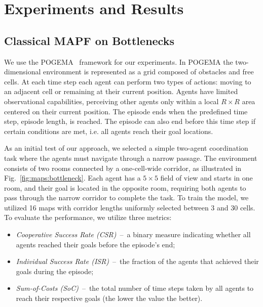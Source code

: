 \documentclass{article} %
\begin{document}
\section{Experiments and Results}


\subsection{Classical MAPF on Bottlenecks}

We use the POGEMA~\citep{skrynnik2024pogema} framework for our experiments. In POGEMA the two-dimensional environment is represented as a grid composed of obstacles and free cells. At each time step each agent can perform two types of actions: moving to an adjacent cell or remaining at their current position. Agents have limited observational capabilities, perceiving other agents only within a local $R\times R$ area centered on their current position. The episode ends when the predefined time step, episode length, is reached. The episode can also end before this time step if certain conditions are met, i.e. all agents reach their goal locations.

As an initial test of our approach, we selected a simple two-agent coordination task where the agents must navigate through a narrow passage. The environment consists of two rooms connected by a one-cell-wide corridor, as illustrated in Fig.~\ref{fig:maps:bottleneck}. Each agent has a $5\times 5$ field of view and starts in one room, and their goal is located in the opposite room, requiring both agents to pass through the narrow corridor to complete the task. To train the model, we utilized 16 maps with corridor lengths uniformly selected between 3 and 30 cells. To evaluate the performance, we utilize three metrics: 

\begin{itemize}
    \item \textit{Cooperative Success Rate (CSR)}~--~a binary measure indicating whether all agents reached their goals before the episode's end;
    \item \textit{Individual Success Rate (ISR)}~--~the fraction of the agents that achieved their goals during the episode;
    \item \textit{Sum-of-Costs (SoC)}~--~the total number of time steps taken by all agents to reach their respective goals (the lower the value the better).
\end{itemize}
\end{document}

